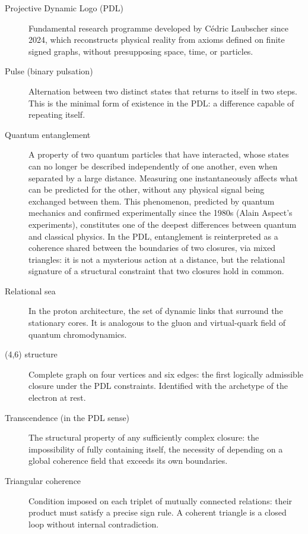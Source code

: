 \documentclass[12pt, a4paper, openright]{book}
\begin{document}
\begin{description}
\item[Projective Dynamic Logo (PDL)] Fundamental research programme developed by Cédric Laubscher since 2024, which reconstructs physical reality from axioms defined on finite signed graphs, without presupposing space, time, or particles.

\item[Pulse (binary pulsation)] Alternation between two distinct states that returns to itself in two steps. This is the minimal form of existence in the PDL: a difference capable of repeating itself.

\item[Quantum entanglement] A property of two quantum particles that have interacted, whose states can no longer be described independently of one another, even when separated by a large distance. Measuring one instantaneously affects what can be predicted for the other, without any physical signal being exchanged between them. This phenomenon, predicted by quantum mechanics and confirmed experimentally since the 1980s (Alain Aspect's experiments), constitutes one of the deepest differences between quantum and classical physics. In the PDL, entanglement is reinterpreted as a coherence shared between the boundaries of two closures, via mixed triangles: it is not a mysterious action at a distance, but the relational signature of a structural constraint that two closures hold in common.

\item[Relational sea] In the proton architecture, the set of dynamic links that surround the stationary cores. It is analogous to the gluon and virtual-quark field of quantum chromodynamics.

\item[(4,6) structure] Complete graph on four vertices and six edges: the first logically admissible closure under the PDL constraints. Identified with the archetype of the electron at rest.

\item[Transcendence (in the PDL sense)] The structural property of any sufficiently complex closure: the impossibility of fully containing itself, the necessity of depending on a global coherence field that exceeds its own boundaries.

\item[Triangular coherence] Condition imposed on each triplet of mutually connected relations: their product must satisfy a precise sign rule. A coherent triangle is a closed loop without internal contradiction.

\end{description}
\end{document}
